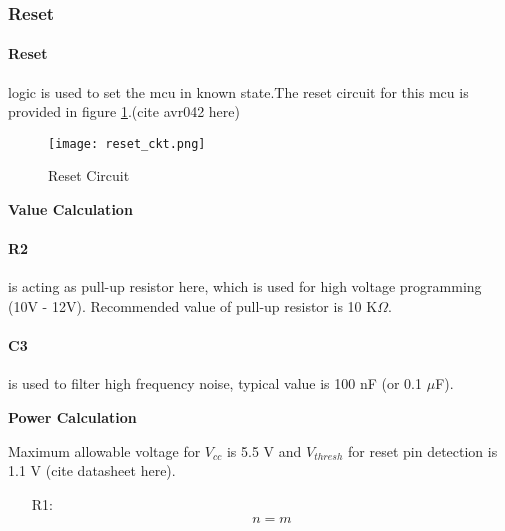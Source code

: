 
\subsubsection{Reset}

	\paragraph{Reset}
	logic is used to set the \gls{mcu} in known state.The reset circuit for this \gls{mcu} is provided in figure \ref{fig:reset_circuit}.(cite avr042 here)
	
	\begin{figure}[H]
		\caption{Reset Circuit}
		\label{fig:reset_circuit}
		\texttt{[image: reset\_ckt.png]}
	\end{figure}
	
	\textbf{Value Calculation}	
	\paragraph{R2}
	is acting as pull-up resistor here, which is used for high voltage programming (10V - 12V). Recommended value of pull-up resistor is 10 K$\Omega$.
	
	\paragraph{C3} 
	is used to filter high frequency noise, typical value is 100 nF (or 0.1 $\mu$F).
	
	\textbf{Power Calculation}
	
	Maximum allowable voltage for $V_{cc}$ is 5.5 V and $ V_{thresh}$ for reset pin detection is 1.1 V (cite datasheet here). 
	\begin{itemize}
		\item[R1:]
			\begin{align}
				n =m
			\end{align}
	\end{itemize}
	
